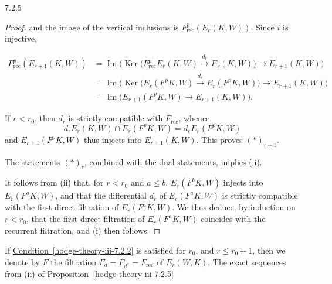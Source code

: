 \begin{proposition}{7.2.5}
\begin{proof}
      
      and the image of the vertical inclusions is \(F_\mathrm {rec}^p(E_r(K,W))\).
      Since \(i\) is injective,

      \[         \begin {aligned}           F_\mathrm {rec}^p(E_{r+1}(K,W))           &= \operatorname {Im}\Big ( \operatorname {Ker} \big (F_\mathrm {rec}^pE_r(K,W)\xrightarrow {d_r}E_r(K,W) \big ) \to  E_{r+1}(K,W) \Big )         \\&= \operatorname {Im}\Big ( \operatorname {Ker}\big ( E_r(F^pK,W)\xrightarrow {d_r}E_r(F^pK,W) \big ) \to  E_{r+1}(K,W) \Big )         \\&= \operatorname {Im}\big ( E_{r+1}(F^pK,W) \to  E_{r+1}(K,W) \big ).         \end {aligned}       \]

      If \(r<r_0\), then \(d_r\) is strictly compatible with \(F_\mathrm {rec}\), whence
      \[         d_rE_r(K,W)\cap  E_r(F^pK,W)         = d_rE_r(F^pK,W)       \]
      and \(E_{r+1}(F^pK,W)\) thus injects into \(E_{r+1}(K,W)\).
      This proves \((*)_{r+1}\).\par{}The statements \((*)_r\), combined with the dual statements, implies (ii).\par{}It follows from (ii) that, for \(r<r_0\) and \(a\leqslant  b\), \(E_r(F^bK,W)\) injects into \(E_r(F^aK,W)\), and that the differential \(d_r\) of \(E_r(F^aK,W)\) is strictly compatible with the first direct filtration of \(E_r(F^aK,W)\).
      We thus deduce, by induction on \(r<r_0\), that the first direct filtration of \(E_r(F^aK,W)\) coincides with the recurrent filtration, and (i) then follows.\end{proof}\end{proposition}\label{hodge-theory-iii-7.2.6}\par{}If \hyperref[hodge-theory-iii-7.2.2]{Condition~\ref*{hodge-theory-iii-7.2.2}} is satisfied for \(r_0\), and \(r\leqslant  r_0+1\), then we denote by \(F\) the filtration \(F_d=F_{d^*}=F_\mathrm {rec}\) of \(E_r(W,K)\).
    The exact sequences from (ii) of \hyperref[hodge-theory-iii-7.2.5]{Proposition~\ref*{hodge-theory-iii-7.2.5}}

    


